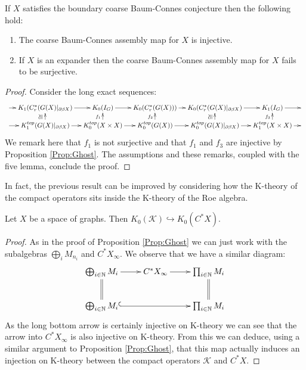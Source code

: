 \begin{conjecture}
{\begin{proposition}\label{Prop:Cor}
If $X$ satisfies the boundary coarse Baum-Connes conjecture then the following hold:
\begin{enumerate}
\item The coarse Baum-Connes assembly map for $X$ is injective.
\item If $X$ is an expander then the coarse Baum-Connes assembly map for $X$ fails to be surjective.
\end{enumerate}
\end{proposition}
\begin{proof}
Consider the long exact sequences:
$$
\xymatrix@=1em{\ar[r] &
K_{1}(C^{*}_{r}(G(X)|_{\partial\beta X}) \ar[r] & K_{0}(I_{G}) \ar[r]& K_{0}(C^{*}_{r}(G(X))) \ar[r]& K_{0}(C^{*}_{r}(G(X)|_{\partial\beta X})\ar[r] & K_{1}(I_{G}) \ar[r] & \\
\ar[r] & K_{1}^{top}(G(X)|_{\partial\beta X}) \ar[r] \ar[u]^{\ucong}& K_{0}^{top}(X \times X) \ar[r]\ar[u]^{f_{1}}& K_{0}^{top}(G(X)) \ar[r]\ar[u]^{f_{2}}& K_{0}^{top}(G(X)|_{\partial\beta X}) \ar[r]\ar[u]^{\ucong}& K_{1}^{top}(X \times X)\ar[u]^{f_{3}} \ar[r] & 
}
$$
We remark here that $f_{1}$ is not surjective and that $f_{1}$ and $f_{3}$ are injective by Proposition \ref{Prop:Ghost}. The assumptions and these remarks, coupled with the five lemma, conclude the proof.
\end{proof}

In fact, the previous result can be improved by considering how the K-theory of the compact operators sits inside the K-theory of the Roe algebra.

\begin{proposition}\label{Prop:subCool}
Let $X$ be a space of graphs. Then $K_{0}(\mathcal{K}) \hookrightarrow K_{0}(C^{*}X)$.
\end{proposition}
\begin{proof}
As in the proof of Proposition \ref{Prop:Ghost} we can just work with the subalgebras $\bigoplus_{i}M_{n_{i}}$ and $C^{*}X_{\infty}$. We observe that we have a similar diagram:
\begin{equation*}
\xymatrix{\bigoplus_{i \in \mathbb{N}} M_{i} \ar@{->}[r]\ar@{=}[d]  &  C^{*}X_{\infty} \ar@{->}[r]& \prod_{i\in \mathbb{N}}M_{i}\ar@{=}[d]\\
\bigoplus_{i \in \mathbb{N}} M_{i}\ar@{^{(}->}[rr] &  & \prod_{i\in \mathbb{N}}M_{i}
}
\end{equation*}
As the long bottom arrow is certainly injective on K-theory we can see that the arrow into $C^{*}X_{\infty}$ is also injective on K-theory. From this we can deduce, using a similar argument to Proposition \ref{Prop:Ghost}, that this map actually induces an injection on K-theory between the compact operators $\mathcal{K}$ and $C^{*}X$.
\end{proof}

}
\end{conjecture}
